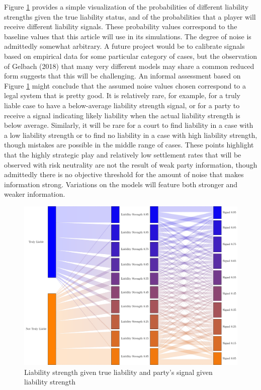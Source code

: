 \documentclass{article}
\begin{document}
Figure \ref{fig:liabilitysignalsdefault} provides a simple visualization of the probabilities of different liability strengths given the true liability status, and of the probabilities that a player will receive different liability signals. These probability values correspond to the baseline values that this article will use in its simulations. The degree of noise is admittedly somewhat arbitrary. A future project would be to calibrate signals based on empirical data for some particular category of cases, but the observation of Gelbach (2018) \cite{gelbach} that many very different models may share a common reduced form suggests that this will be challenging. An informal assessment based on Figure \ref{fig:liabilitysignalsdefault} might conclude that the assumed noise values chosen correspond to a legal system that is pretty good. It is relatively rare, for example, for a truly liable case to have a below-average liability strength signal, or for a party to receive a signal indicating likely liability when the actual liability strength is below average. Similarly, it will be rare for a court to find liability in a case with a low liability strength or to find no liability in a case with high liability strength, though mistakes are possible in the middle range of cases. These points highlight that the highly strategic play and relatively low settlement rates that will be observed with risk neutrality are not the result of weak party information, though admittedly there is no objective threshold for the amount of noise that makes information strong. Variations on the models will feature both stronger and weaker information.

\begin{figure}[h!]
\centering
\includegraphics[scale=0.4, trim={0in 0in 0in 0in}, clip]{../Figures/liability signals default.pdf}
\caption{Liability strength given true liability and party's signal given liability strength}
\label{fig:liabilitysignalsdefault}
\end{figure}
\end{document}
